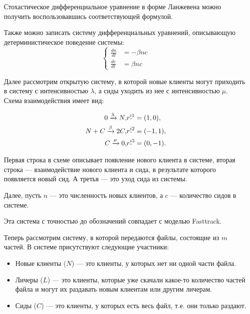 \documentclass[floatfix,
showkeys,
twocolumn, nofootinbib, superscriptaddress, ]{revtex4-1}
\newcommand{\crd}[1]{\underline{\vphantom{j}{#1}}}
\begin{document}
Стохастическое дифференциальное уравнение в форме Ланжевена можно
получить воспользовавшись соответствующей формулой.

Также можно записать систему дифференциальных уравнений, описывающую
детерминистическое поведение системы:
\begin{equation} 
\label{bt:5}
\left \{
\begin{aligned}
 \frac{dn}{d t}&=      - \beta n c\\
 \frac{dc}{d t}&=     \beta n c 
\end{aligned}
\right.
\end{equation}

Далее рассмотрим открытую систему, в которой новые клиенты могут
приходить в систему с интенсивностью $\lambda$, а сиды уходить из нее
с интенсивностью $\mu$. Схема взаимодействия имеет вид:

\begin{equation} 
\label{bt:6}
\begin{aligned}
0 \xrightarrow{\lambda } N, & r^{\crd{i}1}=(1,0),\\
N+C \xrightarrow{\beta } 2C, & r^{\crd{i}2}=(-1,1),\\
C  \xrightarrow{\mu } 0, & r^{\crd{i}3}=(0,-1).
\end{aligned}
\end{equation}


Первая строка в схеме описывает появление нового клиента в системе,
вторая строка --- взаимодействие нового клиента и сида, в результате
которого появляется новый сид. А третья --- это уход сида из системы.

Далее, пусть $n$ --- это численность новых клиентов, а $c$ ---
количество сидов в системе.

Эта система с точностью до обозначений совпадает с моделью Fasttrack.

Теперь рассмотрим систему, в которой передаются файлы, состоящие из
$m$ частей. В системе присутствуют следующие участники:

\begin{itemize}
\item Новые клиенты ($N$) --- это клиенты, у которых нет ни одной
  части файла.
\item Личеры ($L$) --- это клиенты, которые уже скачали какое-то
  количество частей файла и могут их раздавать новым клиентам или
  другим личерам.
\item Сиды ($C$) --- это клиенты, у которых есть весь файл, т.е. они
  только раздают.
\end{itemize}
\end{document}

